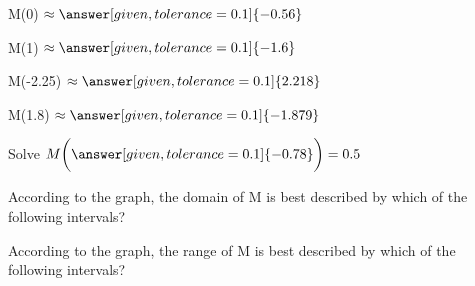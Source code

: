 \documentclass{ximera}
\begin{document}
\begin{exercise}
M(0)   $\approx \answer[given,tolerance=0.1]{-0.56}$
\end{exercise}


\begin{exercise}
M(1)   $\approx \answer[given,tolerance=0.1]{-1.6}$
\end{exercise}


\begin{exercise}
M(-2.25)   $\approx \answer[given,tolerance=0.1]{2.218}$
\end{exercise}


\begin{exercise}
M(1.8)   $\approx \answer[given,tolerance=0.1]{-1.879}$
\end{exercise}


\begin{exercise}
Solve   $ M\bigg( \answer[given,tolerance=0.1]{-0.78} \bigg) = 0.5$
\end{exercise}







\begin{exercise}
According to the graph, the domain of M is best described by which of the following intervals?
\begin{multipleChoice}
\choice{$[-4, 3]$}
\choice[correct]{$[-4, 3)$}
\choice{$(-4, 3]$}
\end{multipleChoice}
\end{exercise}

\begin{exercise}
According to the graph, the range of M is best described by which of the following intervals?
\begin{multipleChoice}
\choice{$[2.5, -1.9]$}
\choice[correct]{$[-1.9, 2.5]$}
\end{multipleChoice}
\end{exercise}
\end{document}
